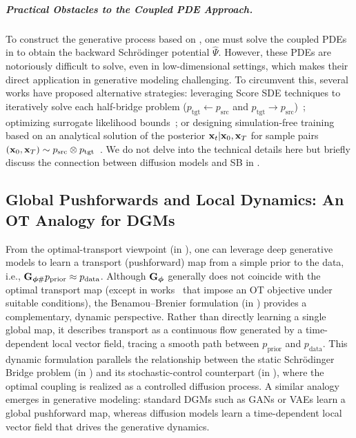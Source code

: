 \subparagraph{Practical Obstacles to the Coupled PDE Approach.}
To construct the generative process based on , one must solve the coupled PDEs in  to obtain the backward Schrödinger potential $\widehat{\Psi}$. However, these PDEs are notoriously difficult to solve, even in low-dimensional settings, which makes their direct application in generative modeling challenging. To circumvent this, several works have proposed alternative strategies: leveraging Score SDE techniques to iteratively solve each half-bridge problem ($p_{\mathrm{tgt}} \leftarrow p_{\mathrm{src}}$ and $p_{\mathrm{tgt}} \rightarrow p_{\mathrm{src}}$)~\citep{de2021diffusion}; optimizing surrogate likelihood bounds~\citep{chenlikelihood, liu20232}; or designing simulation-free training based on an analytical solution of the posterior ${\mathbf{x}}_t \vert {\mathbf{x}}_0, {\mathbf{x}}_T$ for sample pairs $({\mathbf{x}}_0, {\mathbf{x}}_T) \sim p_{\mathrm{src}} \otimes p_{\mathrm{tgt}}$~\citep{liu20232}. We do not delve into the technical details here but briefly discuss the connection between diffusion models and SB in .

\subsection{Global Pushforwards and Local Dynamics: An OT Analogy for DGMs}
From the optimal-transport viewpoint (in ), one can leverage deep generative models to learn a transport (pushforward) map from a simple prior to the data, i.e., 
${\mathbf{G}}_{\bm{\phi}\#}p_{\mathrm{prior}} \approx p_{\mathrm{data}}$. 
Although ${\mathbf{G}}_{\bm{\phi}}$ generally does not coincide with the optimal transport map 
(except in works~\citep{genevay2018learning,onken2021ot} that impose an OT objective under suitable conditions), 
the Benamou--Brenier formulation (in ) provides a complementary, dynamic perspective. 
Rather than directly learning a single global map, it describes transport as a continuous flow generated by a time-dependent local vector field, tracing a smooth path between $p_{\mathrm{prior}}$ and $p_{\mathrm{data}}$. 
This dynamic formulation parallels the relationship between the static Schrödinger Bridge problem (in ) and its stochastic-control counterpart (in ), 
where the optimal coupling is realized as a controlled diffusion process. 
A similar analogy emerges in generative modeling: 
standard DGMs such as GANs or VAEs learn a global pushforward map, 
whereas diffusion models learn a time-dependent local vector field that drives the generative dynamics.





